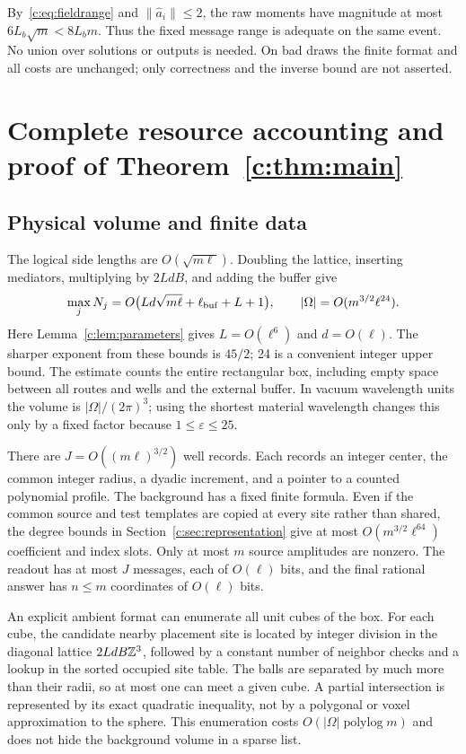 By~\eqref{c:eq:fieldrange} and $\|\widehat a_i\|\le2$, the raw moments
have magnitude at most $6L_b\sqrt m<8L_bm$. Thus the fixed message
range is adequate on the same event. No union over solutions or
outputs is needed. On bad draws the finite format and all costs
are unchanged; only correctness and the inverse bound are not
asserted.

\section{\texorpdfstring{Complete resource accounting and proof of Theorem~\ref{c:thm:main}}{Complete resource accounting and proof of the continuum realization theorem}}
\label{c:sec:cost}

\subsection{Physical volume and finite data}
The logical side lengths are $O(\sqrt{m\ell})$. Doubling the lattice,
inserting mediators, multiplying by $2LdB$, and adding the buffer give
\begin{equation}
 \max_j N_j=O\big(Ld\sqrt{m\ell}+\ell_{\rm buf}+L+1\big),
 \qquad
 |\Omega|=O(m^{3/2}\ell^{24}).                       \label{c:eq:volume-final}
\end{equation}
Here Lemma~\ref{c:lem:parameters} gives $L=O(\ell^6)$ and $d=O(\ell)$.
The sharper exponent from these bounds is $45/2$; 24 is a convenient
integer upper bound. The estimate counts the entire rectangular box,
including empty space between all routes and wells and the external
buffer. In vacuum wavelength units the volume is $|\Omega|/(2\pi)^3$;
using the shortest material wavelength changes this only by a fixed
factor because $1\le\varepsilon\le25$.

There are $J=O((m\ell)^{3/2})$ well records. Each records an integer
center, the common integer radius, a dyadic increment, and a pointer
to a counted polynomial profile. The background has a fixed finite
formula. Even if the common source and test templates are copied at
every site rather than shared, the degree bounds in
Section~\ref{c:sec:representation} give at most
$O(m^{3/2}\ell^{64})$ coefficient and index slots.
Only at most $m$ source amplitudes are nonzero. The readout has at
most $J$ messages, each of $O(\ell)$ bits, and the final rational
answer has $n\le m$ coordinates of $O(\ell)$ bits.

An explicit ambient format can enumerate all unit cubes of the box.
For each cube, the candidate nearby placement site is located by
integer division in the diagonal lattice $2LdB\mathbb Z^3$, followed by a
constant number of neighbor checks and a lookup in the sorted occupied
site table. The balls are separated by much more than their radii,
so at most one can meet a given cube. A partial intersection is
represented by its exact quadratic inequality, not by a polygonal or
voxel approximation to the sphere. This enumeration costs
$O(|\Omega|\operatorname{polylog}m)$ and does not hide the background
volume in a sparse list.

